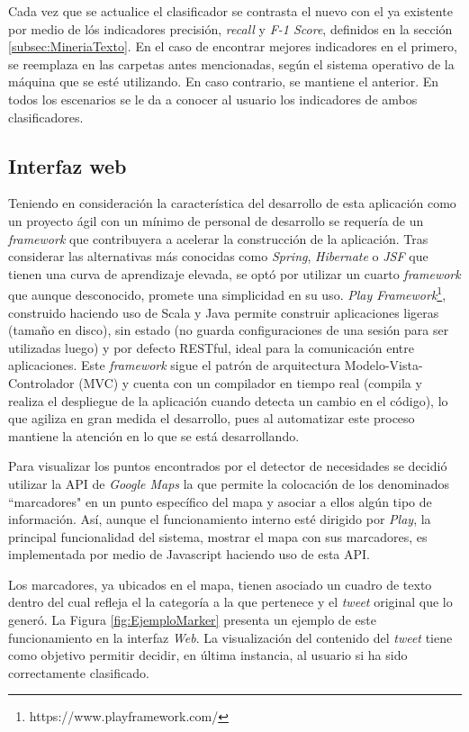 Cada vez que se actualice el clasificador se contrasta el nuevo con el ya existente por medio de lós indicadores precisión, \textit{recall} y \textit{F-1 Score}, definidos en la sección \ref{subsec:MineriaTexto}. En el caso de encontrar mejores indicadores en el primero, se reemplaza en las carpetas antes mencionadas, según el sistema operativo de la máquina que se esté utilizando. En caso contrario, se mantiene el anterior. En todos los escenarios se le da a conocer al usuario los indicadores de ambos clasificadores.

\subsection{Interfaz web}
\label{sec:diseno:interfaz}

Teniendo en consideración la característica del desarrollo de esta aplicación como un proyecto ágil con un mínimo de personal de desarrollo se requería de un \textit{framework} que contribuyera a acelerar la construcción de la aplicación. Tras considerar las alternativas más conocidas como \textit{Spring}, \textit{Hibernate} o \textit{JSF} que tienen una curva de aprendizaje elevada, se optó por utilizar un cuarto \textit{framework} que aunque desconocido, promete una simplicidad en su uso. \textit{Play Framework}\footnote{https://www.playframework.com/}, construido haciendo uso de Scala y Java permite construir aplicaciones ligeras (tamaño en disco), sin estado (no guarda configuraciones de una sesión para ser utilizadas luego) y por defecto RESTful, ideal para la comunicación entre aplicaciones. Este \textit{framework} sigue el patrón de arquitectura Modelo-Vista-Controlador (MVC) y cuenta con un compilador en tiempo real (compila y realiza el despliegue de la aplicación cuando detecta un cambio en el código), lo que agiliza en gran medida el desarrollo, pues al automatizar este proceso mantiene la atención en lo que se está desarrollando.

Para visualizar los puntos encontrados por el detector de necesidades se decidió utilizar la API de \textit{Google Maps} la que permite la colocación de los denominados ``marcadores" en un punto específico del mapa y asociar a ellos algún tipo de información. Así, aunque el funcionamiento interno esté dirigido por \textit{Play}, la principal funcionalidad del sistema, mostrar el mapa con sus marcadores, es implementada por medio de Javascript haciendo uso de esta API.

Los marcadores, ya ubicados en el mapa, tienen asociado un cuadro de texto dentro del cual refleja el la categoría a la que pertenece y el \textit{tweet} original que lo generó. La Figura \ref{fig:EjemploMarker} presenta un ejemplo de este funcionamiento en la interfaz \textit{Web}. La visualización del contenido del \textit{tweet} tiene como objetivo permitir decidir, en última instancia, al usuario si ha sido correctamente clasificado.


